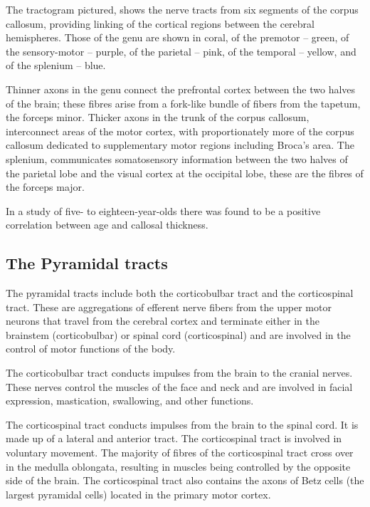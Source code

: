 The tractogram pictured, shows the nerve tracts from six segments of the corpus callosum, providing linking of the cortical regions between the cerebral hemispheres. Those of the genu are shown in coral, of the premotor -- green, of the sensory-motor -- purple, of the parietal -- pink, of the temporal -- yellow, and of the splenium -- blue.

Thinner axons in the genu connect the prefrontal cortex between the two halves of the brain; these fibres arise from a fork-like bundle of fibers from the tapetum, the forceps minor. Thicker axons in the trunk of the corpus callosum, interconnect areas of the motor cortex, with proportionately more of the corpus callosum dedicated to supplementary motor regions including Broca's area. The splenium, communicates somatosensory information between the two halves of the parietal lobe and the visual cortex at the occipital lobe, these are the fibres of the forceps major.

In a study of five- to eighteen-year-olds there was found to be a positive correlation between age and callosal thickness.

\hypertarget{the-pyramidal-tracts}{%
\subsection{The Pyramidal tracts}\label{the-pyramidal-tracts}}

The pyramidal tracts include both the corticobulbar tract and the corticospinal tract. These are aggregations of efferent nerve fibers from the upper motor neurons that travel from the cerebral cortex and terminate either in the brainstem (corticobulbar) or spinal cord (corticospinal) and are involved in the control of motor functions of the body.

The corticobulbar tract conducts impulses from the brain to the cranial nerves. These nerves control the muscles of the face and neck and are involved in facial expression, mastication, swallowing, and other functions.

The corticospinal tract conducts impulses from the brain to the spinal cord. It is made up of a lateral and anterior tract. The corticospinal tract is involved in voluntary movement. The majority of fibres of the corticospinal tract cross over in the medulla oblongata, resulting in muscles being controlled by the opposite side of the brain. The corticospinal tract also contains the axons of Betz cells (the largest pyramidal cells) located in the primary motor cortex.

